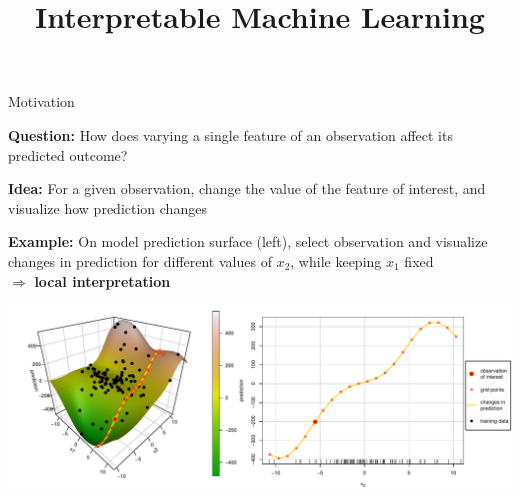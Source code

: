 \documentclass[10pt,compress,t,notes=noshow, xcolor=table]{beamer}
\title{Interpretable Machine Learning}
\date{}
\begin{document}



\begin{frame}{Motivation}

\textbf{Question:} How does varying a single feature of an observation affect its predicted outcome?

\smallskip

\textbf{Idea:} For a given observation, change the value of the feature of interest, and visualize how prediction changes

\smallskip

\textbf{Example:} On model prediction surface (left), select observation and visualize changes in prediction for different values of $x_2$, while keeping $x_1$ fixed \\ $\Rightarrow$ \textbf{local interpretation}

\bigskip
\centering
\includegraphics[width=\textwidth]{figure/ice_motivation}

\end{frame}
\end{document}
